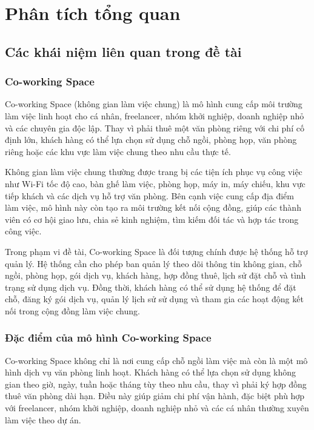 \section{Phân tích tổng quan}
\subsection{Các khái niệm liên quan trong đề tài}

\subsubsection{Co-working Space}

Co-working Space (không gian làm việc chung) là mô hình cung cấp môi trường làm việc linh hoạt cho cá nhân, freelancer, nhóm khởi nghiệp, doanh nghiệp nhỏ và các chuyên gia độc lập. Thay vì phải thuê một văn phòng riêng với chi phí cố định lớn, khách hàng có thể lựa chọn sử dụng chỗ ngồi, phòng họp, văn phòng riêng hoặc các khu vực làm việc chung theo nhu cầu thực tế.

Không gian làm việc chung thường được trang bị các tiện ích phục vụ công việc như Wi-Fi tốc độ cao, bàn ghế làm việc, phòng họp, máy in, máy chiếu, khu vực tiếp khách và các dịch vụ hỗ trợ văn phòng. Bên cạnh việc cung cấp địa điểm làm việc, mô hình này còn tạo ra môi trường kết nối cộng đồng, giúp các thành viên có cơ hội giao lưu, chia sẻ kinh nghiệm, tìm kiếm đối tác và hợp tác trong công việc.

Trong phạm vi đề tài, Co-working Space là đối tượng chính được hệ thống hỗ trợ quản lý. Hệ thống cần cho phép ban quản lý theo dõi thông tin không gian, chỗ ngồi, phòng họp, gói dịch vụ, khách hàng, hợp đồng thuê, lịch sử đặt chỗ và tình trạng sử dụng dịch vụ. Đồng thời, khách hàng có thể sử dụng hệ thống để đặt chỗ, đăng ký gói dịch vụ, quản lý lịch sử sử dụng và tham gia các hoạt động kết nối trong cộng đồng làm việc chung.

\subsubsection{Đặc điểm của mô hình Co-working Space}

Co-working Space không chỉ là nơi cung cấp chỗ ngồi làm việc mà còn là một mô hình dịch vụ văn phòng linh hoạt. Khách hàng có thể lựa chọn sử dụng không gian theo giờ, ngày, tuần hoặc tháng tùy theo nhu cầu, thay vì phải ký hợp đồng thuê văn phòng dài hạn. Điều này giúp giảm chi phí vận hành, đặc biệt phù hợp với freelancer, nhóm khởi nghiệp, doanh nghiệp nhỏ và các cá nhân thường xuyên làm việc theo dự án.

